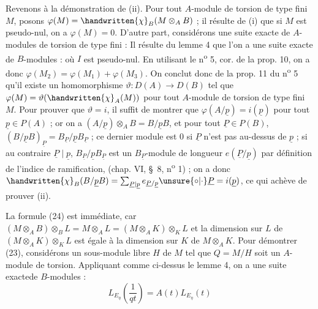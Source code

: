 Revenons à la démonstration de (ii). Pour tout $A$-module de torsion de type fini $M$, posons $\varphi(M)=\handwritten{\chi}_B(M\otimes_A B)$ ; il résulte de (i) que si $M$ est pseudo-nul, on a $\varphi(M)=0$. D'autre part, considérons une suite exacte de $A$-modules de torsion de type fini :
Il résulte du lemme 4 que l'on a une suite exacte de $B$-modules :
où $I$ est pseudo-nul. En utilisant le n\textsuperscript{o} 5, cor. de la prop. 10, on a donc $\varphi(M_2)=\varphi(M_1)+\varphi(M_3)$. On conclut donc de la prop. 11 du n\textsuperscript{o} 5 qu'il existe un homomorphisme $\vartheta:D(A)\longrightarrow D(B)$ tel que $\varphi(M)=\vartheta(\handwritten{\chi}_A(M))$ pour tout $A$-module de torsion de type fini $M$. Pour prouver que $\vartheta=i$, il suffit de montrer que $\varphi(A/\underline p)=i(\underline p)$ pour tout $\underline p\in P(A)$ ; or on a $(A/\underline p)\otimes_A B=B/\underline p B$, et pour tout $\underline P\in P(B)$, $(B/\underline p B)_{\underline P}=B_{\underline P}/\underline p B_{\underline P}$ ; ce dernier module est 0 si $\underline P$ n'est pas au-dessus de $\underline p$ ; si au contraire $\underline P\mid\underline p$, $B_{\underline P}/\underline p B_{\underline P}$ est un $B_{\underline P}$-module de longueur $e(\underline P/\underline p)$ par définition de l'indice de ramification, (chap. VI, \S~8, n\textsuperscript{o} 1) ; on a donc $\handwritten{\chi}_B(B/\underline p B)=\sum_{\underline P\mid\underline p}e_{\underline P/\underline p}\unsure{\circ|\cdot}\underline P=i(\underline p)$, ce qui achève de prouver (ii).

La formule (24) est immédiate, car $(M\otimes_A B)\otimes_B L=M\otimes_A L=(M\otimes_A K)\otimes_K L$ et la dimension sur $L$ de $(M\otimes_A K)\otimes_K L$ est égale à la dimension sur $K$ de $M\otimes_A K$. Pour démontrer (23), considérons un sous-module libre $H$ de $M$ tel que $Q=M/H$ soit un $A$-module de torsion. Appliquant comme ci-dessus le lemme 4, on a une suite exacte\unsure{-}de $B$-modules :
\[
L_{E_\eta}\left(\frac1{qt}\right)=A(t)L_{E_\eta}(t)
\]

